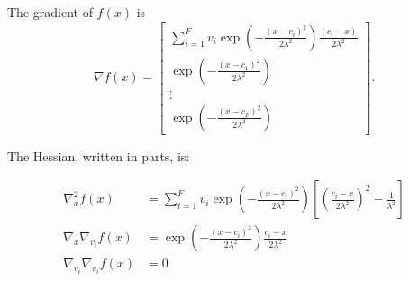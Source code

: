The gradient of $f(x)$ is
\begin{equation}
  \nabla f(x) =
  \begin{bmatrix}
    \sum_{i=1}^F v_i \exp\left(-\frac{(x-c_i)^2}{2\lambda^2}\right)
      \frac{(c_i-x)}{2\lambda^2}\\
    \exp\left(-\frac{(x-c_1)^2}{2\lambda^2}\right) \\
    \vdots \\
    \exp\left(-\frac{(x-c_F)^2}{2\lambda^2}\right)
  \end{bmatrix}.
\end{equation}

The Hessian, written in parts, is:
\begin{fullwidth}\vspace{-\baselineskip}
\begin{subequations}
  \begin{align}
    \nabla^2_x f(x) &= \sum_{i=1}^F v_i
      \exp\left(-\frac{(x-c_i)^2}{2\lambda^2}\right)
      \left[
        \left(\frac{c_i - x}{2\lambda^2}\right)^2 - \frac{1}{\lambda^2}
      \right]
      \\
    \nabla_x \nabla_{v_i} f(x) &= \exp\left(-\frac{(x-c_i)^2}{2\lambda^2}\right)
        \frac{c_i - x}{2\lambda^2}\\
    \nabla_{v_i} \nabla_{v_i} f(x) &= 0
  \end{align}
\end{subequations}
\end{fullwidth}

